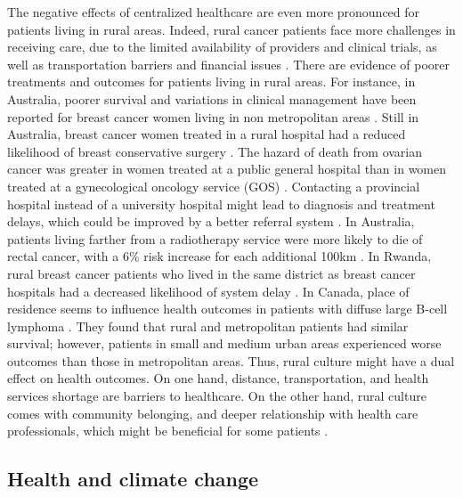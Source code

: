 The negative effects of centralized healthcare are even more pronounced for patients living in rural areas. Indeed, rural cancer patients face more challenges in receiving care, due to the limited availability of providers and clinical trials, as well as transportation barriers and financial issues \cite{charlton_challenges_2015}. There are evidence of poorer treatments and outcomes for patients living in rural areas. For instance, in Australia, poorer survival and variations in clinical management have been reported for breast cancer women living in non metropolitan areas \cite{dasgupta_variations_2018}. Still in Australia, breast cancer women treated in a rural hospital had a reduced likelihood of breast conservative surgery \cite{hall_unequal_2004}.  The hazard of death from ovarian cancer was greater in women treated at a public general hospital than in women treated at a gynecological oncology service (GOS) \cite{tracey_effects_2014}. Contacting a provincial hospital instead of a university hospital might lead to diagnosis and treatment delays, which could be improved by a better referral system \cite{thongsuksai_delay_2000}. In Australia, patients living farther from a radiotherapy service were more likely to die of rectal cancer, with a 6\% risk increase for each additional 100km \cite{baade_distance_2011}. In Rwanda, rural breast cancer patients who lived in the same district as breast cancer hospitals had a decreased likelihood of system delay \cite{pace_delays_2015}. In Canada, place of residence seems to influence health outcomes in patients with diffuse large B-cell lymphoma \cite{lee_effect_2014}. They found that rural and metropolitan patients had similar survival; however, patients in small and medium urban areas experienced worse outcomes than those in metropolitan areas. Thus, rural culture might have a dual effect on health outcomes. On one hand, distance, transportation, and health services shortage are barriers to healthcare. On the other hand, rural culture comes with community belonging, and deeper relationship with health care professionals, which might be beneficial for some patients \cite{brundisini_chronic_2013}.

\subsection{Health and climate change}

